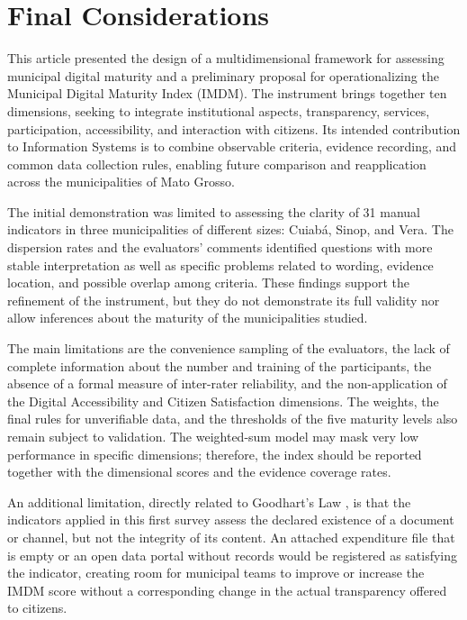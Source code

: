 \documentclass[12pt]{article}
\begin{document}
\section{Final Considerations}

This article presented the design of a multidimensional framework for assessing municipal digital maturity and a preliminary proposal for operationalizing the Municipal Digital Maturity Index (IMDM). The instrument brings together ten dimensions, seeking to integrate institutional aspects, transparency, services, participation, accessibility, and interaction with citizens. Its intended contribution to Information Systems is to combine observable criteria, evidence recording, and common data collection rules, enabling future comparison and reapplication across the municipalities of Mato Grosso.

The initial demonstration was limited to assessing the clarity of 31 manual indicators in three municipalities of different sizes: Cuiabá, Sinop, and Vera. The dispersion rates and the evaluators’ comments identified questions with more stable interpretation as well as specific problems related to wording, evidence location, and possible overlap among criteria. These findings support the refinement of the instrument, but they do not demonstrate its full validity nor allow inferences about the maturity of the municipalities studied.

The main limitations are the convenience sampling of the evaluators, the lack of complete information about the number and training of the participants, the absence of a formal measure of inter-rater reliability, and the non-application of the Digital Accessibility and Citizen Satisfaction dimensions. The weights, the final rules for unverifiable data, and the thresholds of the five maturity levels also remain subject to validation. The weighted-sum model may mask very low performance in specific dimensions; therefore, the index should be reported together with the dimensional scores and the evidence coverage rates.

An additional limitation, directly related to Goodhart’s Law \cite{goodhart1984problems}, is that the indicators applied in this first survey assess the declared existence of a document or channel, but not the integrity of its content. An attached expenditure file that is empty or an open data portal without records would be registered as satisfying the indicator, creating room for municipal teams to improve or increase the IMDM score without a corresponding change in the actual transparency offered to citizens.
\end{document}
